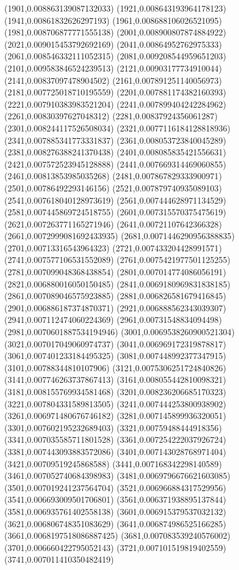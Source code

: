 {(1901,0.008863139087132033)
(1921,0.008643193964178123)
(1941,0.00861832626297193)
(1961,0.008688106026521095)
(1981,0.008706877771555138)
(2001,0.008900807874884922)
(2021,0.009015453792692169)
(2041,0.00864952762975333)
(2061,0.008546332111052315)
(2081,0.009208544959651203)
(2101,0.009583846524239513)
(2121,0.00903177734910044)
(2141,0.00837097478904502)
(2161,0.007891251140056973)
(2181,0.007725018710195559)
(2201,0.007881174382160393)
(2221,0.007910383983521204)
(2241,0.007899404242284962)
(2261,0.00830397627048312)
(2281,0.00837924356061287)
(2301,0.008244117526508034)
(2321,0.0077116184128818936)
(2341,0.007885341773331837)
(2361,0.008053723840045289)
(2381,0.008276388241370438)
(2401,0.008085835421556631)
(2421,0.007572523945128888)
(2441,0.007669314469060855)
(2461,0.00813853985035268)
(2481,0.007867829333900971)
(2501,0.00786492293146156)
(2521,0.007879740935089103)
(2541,0.007618040128973619)
(2561,0.007444628971134529)
(2581,0.007445869724518755)
(2601,0.007315570375475619)
(2621,0.007263771165271946)
(2641,0.00721107642366328)
(2661,0.0072999081692433935)
(2681,0.0071446290956388835)
(2701,0.00713316543964323)
(2721,0.007433204428991571)
(2741,0.007577106531552089)
(2761,0.0075421977501125255)
(2781,0.007099048368438854)
(2801,0.007014774086056191)
(2821,0.006880016050150485)
(2841,0.0069180969831838185)
(2861,0.007089046575923885)
(2881,0.006826581679416845)
(2901,0.006886187374870371)
(2921,0.006888562343039307)
(2941,0.007112474060224369)
(2961,0.00731548834094498)
(2981,0.0070601887534194946)
(3001,0.0069538260900521304)
(3021,0.007017049060974737)
(3041,0.006969172319878817)
(3061,0.007401233184495325)
(3081,0.007448992377347915)
(3101,0.00788344810107906)
(3121,0.0075306251724840826)
(3141,0.007746263737867413)
(3161,0.008055442810098321)
(3181,0.008155769934581468)
(3201,0.008236206685170323)
(3221,0.007804331589813505)
(3241,0.007444253800938902)
(3261,0.006971480676746182)
(3281,0.007145899936320051)
(3301,0.007602195232689403)
(3321,0.00759488444918356)
(3341,0.007035585711801528)
(3361,0.007254222037926724)
(3381,0.007443093883572086)
(3401,0.007143028768971404)
(3421,0.00709519245868588)
(3441,0.007168342298140589)
(3461,0.007052740684398983)
(3481,0.0069796676621603085)
(3501,0.007019241237564704)
(3521,0.006966884317529956)
(3541,0.006693009501706801)
(3561,0.006371938895137844)
(3581,0.006935761402558138)
(3601,0.006915379537032132)
(3621,0.006806748351083629)
(3641,0.006874986525166285)
(3661,0.0068197518086887425)
(3681,0.007083539240576002)
(3701,0.006660422795052143)
(3721,0.007101519819402559)
(3741,0.007011410350482419)
}
